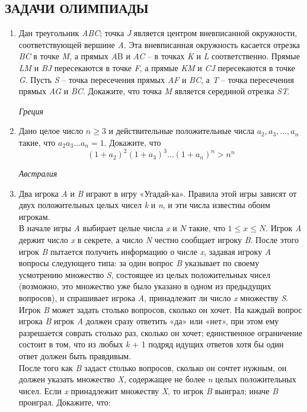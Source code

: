 \documentclass[a4paper,12pt]{article}
\begin{document}
\begin{multicols}{2}
    \subsection*{\centering\scriptsize ЗАДАЧИ ОЛИМПИАДЫ}
    \begin{enumerate}
        \item Дан треугольник \textit{ABC}; точка \textit{J} является центром вневписанной окружности, соответствующей вершине \textit{A}. Эта вневписанная окружность касается отрезка \textit{BC} в точке \textit{M}, а прямых \textit{A}B и \textit{AC} – в точках \textit{K} и \textit{L} соответственно. Прямые \textit{LM} и \textit{BJ} пересекаются в точке \textit{F}, а прямые \textit{KM} и \textit{CJ} пересекаются в точке \textit{G}. Пусть \textit{S} – точка пересечения прямых \textit{AF} и \textit{BC}, а \textit{T} – точка пересечения прямых \textit{AG} и \textit{BC}. Докажите, что точка \textit{M} является серединой отрезка \textit{ST}. \par\hfill \textit{Греция}
        \item Дано целое число $\textit{n} \geq 3$ и действительные положительные числа $a_2, a_3, \dots, a_n$ такие, что $a_2 a_3 \dots a_n = 1$. Докажите, что
            \begin{equation*}
                    (1 + a_2)^2 (1 + a_3)^3 \dots (1 + a_n)^n > n^n
            \end{equation*}
                \par\hfill \textit{Австралия}
        \item Два игрока \textit{A} и \textit{B} играют в игру «Угадай-ка». Правила этой игры зависят от двух положительных целых чисел \textit{k} и \textit{n}, и эти числа известны обоим игрокам. \\ В начале игры \textit{A} выбирает целые числа \textit{x} и \textit{N} такие, что $1 \leq x \leq N$. Игрок \textit{A} держит число \textit{x} в секрете, а число \textit{N} честно сообщает игроку \textit{B}. После этого игрок \textit{B} пытается получить информацию о числе \textit{x}, задавая игроку \textit{A} вопросы следующего типа: за один вопрос \textit{B} указывает по своему
    \columnbreak
        усмотрению множество \textit{S}, состоящее из целых положительных чисел (возможно, это множество уже было указано в одном из предыдущих вопросов), и спрашивает игрока \textit{A}, принадлежит ли число \textit{x} множеству \textit{S}. Игрок \textit{B} может задать столько вопросов, сколько он хочет. На каждый вопрос игрока \textit{B} игрок \textit{A} должен сразу ответить «да» или «нет», при этом ему разрешается соврать столько раз, сколько он хочет; единственное ограничение состоит в том, что из любых \textit{k} + 1 подряд идущих ответов хотя бы один ответ должен быть правдивым. \\ После того как \textit{B} задаст столько вопросов, сколько он сочтет нужным, он должен указать множество \textit{X}, содержащее не более \textit{n} целых положительных чисел. Если \textit{x} принадлежит множеству \textit{X}, то игрок \textit{B} выиграл; иначе \textit{B} проиграл. Докажите, что:

\end{enumerate}
\end{multicols}
\end{document}
